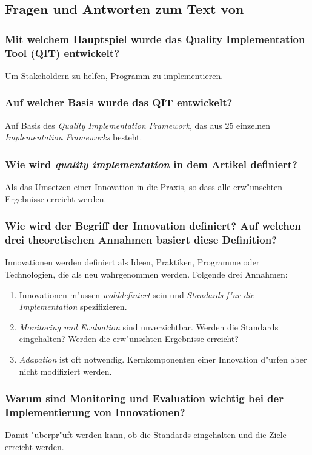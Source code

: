 \subsection{Fragen und Antworten zum Text von \textcite{meyers_practical_2012}}
\subsubsection{Mit welchem Hauptspiel wurde das Quality Implementation Tool (QIT) entwickelt?}
Um Stakeholdern zu helfen, Programm zu implementieren.

\subsubsection{Auf welcher Basis wurde das QIT entwickelt?}
Auf Basis des \emph{Quality Implementation Framework}, das aus $25$ einzelnen \emph{Implementation Frameworks} besteht.

\subsubsection{Wie wird \emph{quality implementation} in dem Artikel definiert?}
Als das Umsetzen einer Innovation in die Praxis, so dass alle erw"unschten Ergebnisse erreicht werden.

\subsubsection{Wie wird der Begriff der Innovation definiert? Auf welchen drei theoretischen Annahmen basiert diese Definition?}
Innovationen werden definiert als Ideen, Praktiken, Programme oder Technologien, die als neu wahrgenommen werden. Folgende drei Annahmen:
\begin{enumerate}
        \item Innovationen m"ussen \emph{wohldefiniert} sein und \emph{Standards f"ur die Implementation} spezifizieren.
        \item \emph{Monitoring und Evaluation} sind unverzichtbar. Werden die Standards eingehalten? Werden die erw"unschten Ergebnisse erreicht?
        \item \emph{Adapation} ist oft notwendig. Kernkomponenten einer Innovation d"urfen aber nicht modifiziert werden.
\end{enumerate}

\subsubsection{Warum sind Monitoring und Evaluation wichtig bei der Implementierung von Innovationen?}
Damit "uberpr"uft werden kann, ob die Standards eingehalten und die Ziele erreicht werden.

